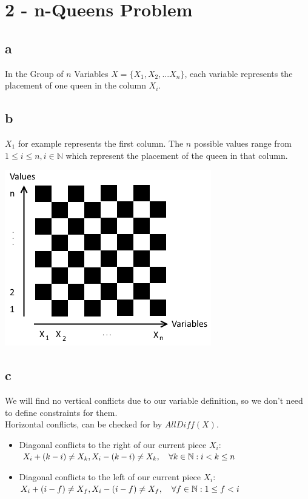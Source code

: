 \documentclass[a4paper]{article}
\begin{document}
\section*{2 - n-Queens Problem}
\subsection*{a}
In the Group of $n$ Variables $X = \{X_1, X_2, ... X_n\}$, each variable represents the placement of one queen in the column $X_i$.

\subsection*{b}
$X_1$ for example represents the first column. The $n$ possible values range from $1 \leq i \leq n, i \in \mathbb{N}$ which represent the placement of the queen in that column.

\begin{center}
	\includegraphics*[]{schach.png}
\end{center}

\subsection*{c}
We will find no vertical conflicts due to our variable definition, so we don't need to define constraints for them. \\
Horizontal conflicts, can be checked for by $AllDiff(X)$.
\begin{itemize}
	\item Diagonal conflicts to the right of our current piece $X_i$: \\
		$X_i + (k-i) \neq X_k, \\
		 X_i - (k-i) \neq X_k, 		\quad \forall k \in \mathbb{N}: i < k \leq n$
	\item Diagonal conflicts to the left of our current piece $X_i$: \\
		$X_i + (i-f) \neq X_f, \\
		 X_i - (i-f) \neq X_f, 		\quad \forall f \in \mathbb{N}: 1 \leq f < i$
\end{itemize}
\end{document}
